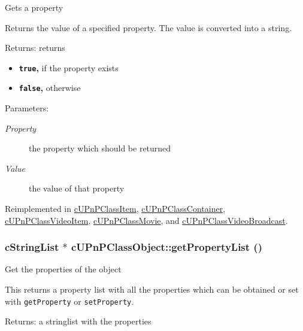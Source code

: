 Gets a property

Returns the value of a specified property. The value is converted into a string.

\begin{Desc}
\item[Returns:]returns\begin{itemize}
\item {\bf {\tt true},} if the property exists\item {\bf {\tt false},} otherwise \end{itemize}
\end{Desc}
\begin{Desc}
\item[Parameters:]
\begin{description}
\item[{\em Property}]the property which should be returned \item[{\em Value}]the value of that property \end{description}
\end{Desc}


Reimplemented in \hyperlink{classcUPnPClassItem_31f7010baa65cc25b95a864f05eb4e62}{cUPnPClassItem}, \hyperlink{classcUPnPClassContainer_f70297d2275e083f05024524d21118d7}{cUPnPClassContainer}, \hyperlink{classcUPnPClassVideoItem_94ab2ffcbe14abb63c680e6748e70ef1}{cUPnPClassVideoItem}, \hyperlink{classcUPnPClassMovie_b4c1d5a973856469b93d2033b65d7ba2}{cUPnPClassMovie}, and \hyperlink{classcUPnPClassVideoBroadcast_e1d13a13de094337cea6be214c4da0f0}{cUPnPClassVideoBroadcast}.\hypertarget{classcUPnPClassObject_4a4d2cd2e59d364050bb64a3d9dced6e}{
\subsubsection[{getPropertyList}]{\setlength{\rightskip}{0pt plus 5cm}cStringList $\ast$ cUPnPClassObject::getPropertyList ()}}
\label{classcUPnPClassObject_4a4d2cd2e59d364050bb64a3d9dced6e}


Get the properties of the object

This returns a property list with all the properties which can be obtained or set with {\tt getProperty} or {\tt setProperty}.

\begin{Desc}
\item[Returns:]a stringlist with the properties \end{Desc}


